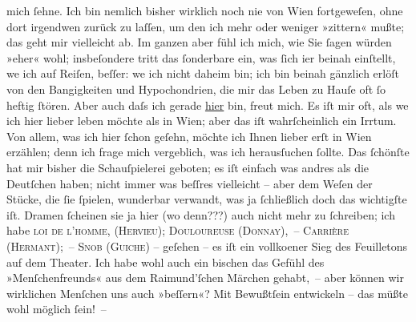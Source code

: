                mich ſehne. Ich bin nemlich bisher wirklich noch nie von Wien fortgeweſen, ohne dort irgendwen zurück zu laſſen, um den
               ich mehr oder weniger »zittern« mußte; das geht mir vielleicht ab. Im ganzen aber
               fühl ich mich, wie Sie ſagen würden »eher« wohl; insbeſondere tritt das ſonderbare
               ein, was ſich i{\geminationm}er beinah einſtellt, we{\geminationn} ich auf Reiſen, beſſer: we{\geminationn} ich nicht daheim bin; ich bin beinah gänzlich erlöſt von den Bangigkeiten und
               Hypochondrien, die mir das Leben zu Hauſe oft ſo heftig ſtören. Aber \introOben{}auch\introOben{} daſs ich gerade \uline{hier} bin,
               freut mich. Es iſt mir oft, als we{\geminationn} ich hier lieber
               leben möchte als in Wien; aber das iſt
                  wahrſchein{\pb}lich ein Irrtum. Von allem, was ich hier
               ſchon geſehn, möchte ich Ihnen lieber erſt in Wien
               erzählen; denn ich frage mich vergeblich, was ich herausſuchen ſollte. Das ſchönſte
               hat mir bisher die Schauſpielerei geboten; es iſt einfach was andres als die
               Deutſchen haben; nicht immer was beſſres vielleicht – aber dem Weſen der Stücke, die
               ſie ſpielen, wunderbar verwandt, was ja ſchließlich doch das wichtigſte iſt. Dramen
               ſcheinen sie ja hier (wo denn???) auch nicht mehr zu ſchreiben; ich habe \textsc{loi de l’homme, (Hervieu); Douloureuse
                     (Donnay), – Carrière (Hermant); –
                     Snob (Guiche)} – geſehen – es iſt ein vollko{\geminationm}ener Sieg des Feuilletons auf dem Theater. Ich habe {\pb}wohl auch ein bischen das Gefühl des »Menſchenfreunds« aus dem Raimund’ſchen Märchen gehabt, – aber können wir wirklichen Menſchen uns auch
               »beſſern«? Mit Bewußtſein entwickeln – das müßte wohl möglich ſein! –\pend
           
